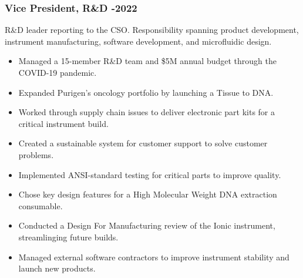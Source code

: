 \documentclass{res}
\begin{document}
\begin{resume}
    \subsubsection{Vice President, R\&D -2022}
      \vspace{-0.2in}
      R\&D leader reporting to the CSO. Responsibility spanning product development, instrument
      manufacturing, software development, and microfluidic design.
      \vspace{0.1in}
       \begin{itemize}
        \item Managed a 15-member R\&D team and \$5M annual budget through the COVID-19 pandemic.
        \item Expanded Purigen's oncology portfolio by launching a Tissue to DNA. 
        \item Worked through supply chain issues to deliver electronic part kits for a critical instrument build.
        \item Created a sustainable system for customer support to solve customer problems.
        \item Implemented ANSI-standard testing for critical parts to improve quality.
        \item Chose key design features for a High Molecular Weight DNA extraction consumable.
        \item Conducted a Design For Manufacturing review of the Ionic instrument, streamlinging future builds.
        \item Managed external software contractors to improve instrument stability and launch new products.
       \end{itemize}

      \vspace{-0.2in}

\end{resume}
\end{document}
